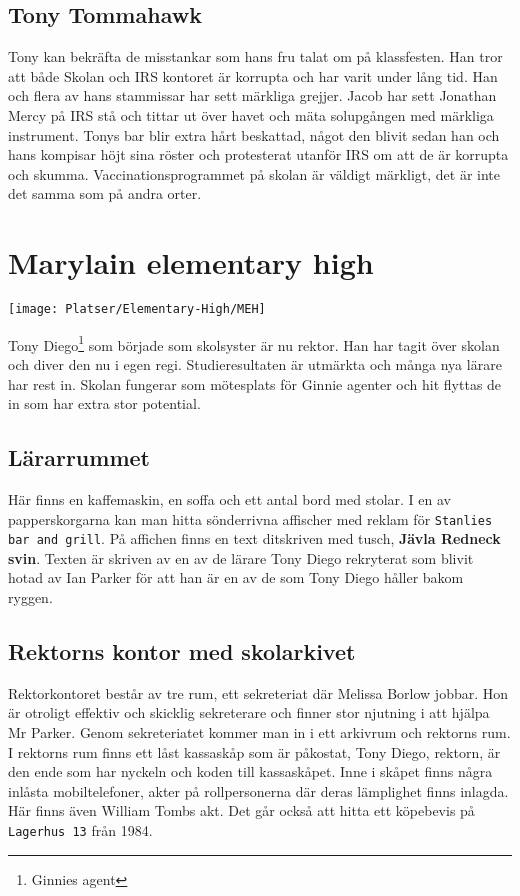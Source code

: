 \documentclass[a5paper,10pt]{report}
\begin{document}
\subsection{Tony Tommahawk}
Tony kan bekräfta de misstankar som hans fru talat om på klassfesten. Han tror att både Skolan och IRS kontoret är korrupta och har varit under lång tid. Han och flera av hans stammissar har sett märkliga grejjer. Jacob har sett Jonathan Mercy på IRS stå och tittar ut över havet och mäta solupgången med märkliga instrument. Tonys bar blir extra hårt beskattad, något den blivit sedan han och hans kompisar höjt sina röster och protesterat utanför IRS om att de är korrupta och skumma. Vaccinationsprogrammet på skolan är väldigt märkligt, det är inte det samma som på andra orter.
\section{Marylain elementary high}
\texttt{[image: Platser/Elementary-High/MEH]}

Tony Diego\footnote{Ginnies agent} som började som skolsyster är nu rektor. Han har tagit över skolan och diver den nu i egen regi. Studieresultaten är utmärkta och många nya lärare har rest in. Skolan fungerar som mötesplats för Ginnie agenter och hit flyttas de in som har extra stor potential.
\subsection{Lärarrummet}
Här finns en kaffemaskin, en soffa och ett antal bord med stolar. I en av papperskorgarna kan man hitta sönderrivna affischer med reklam för \texttt{Stanlies bar and grill}. På affichen finns en text ditskriven med tusch, \textbf{Jävla Redneck svin}. Texten är skriven av en av de lärare Tony Diego rekryterat som blivit hotad av Ian Parker för att han är en av de som Tony Diego håller bakom ryggen.
\subsection{Rektorns kontor med skolarkivet}
Rektorkontoret består av tre rum, ett sekreteriat där Melissa Borlow jobbar. Hon är otroligt effektiv och skicklig sekreterare och finner stor njutning i att hjälpa Mr Parker. Genom sekreteriatet kommer man in i ett arkivrum och rektorns rum.\\

I rektorns rum finns ett låst kassaskåp som är påkostat, Tony Diego, rektorn, är den ende som har nyckeln och koden till kassaskåpet. Inne i skåpet finns några inlåsta mobiltelefoner, akter på rollpersonerna där deras lämplighet finns inlagda. Här finns även William Tombs akt. Det går också att hitta ett köpebevis på \texttt{Lagerhus 13} från 1984.\\
\end{document}
